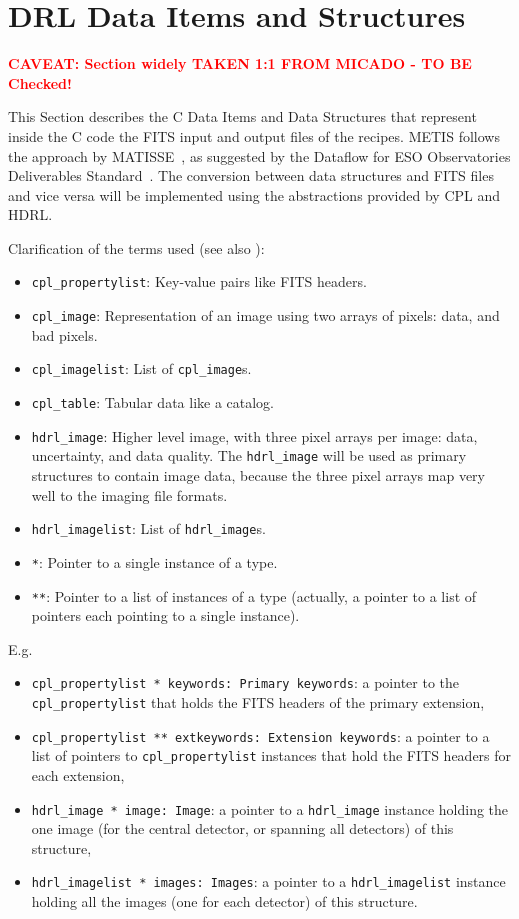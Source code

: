 \clearpage
\section{DRL Data Items and Structures}\label{sec:drl_data_structures}
\Large\textbf{\textcolor{red}{CAVEAT: Section widely TAKEN 1:1 FROM MICADO - TO BE Checked!}}\normalsize


This Section describes the C Data Items and Data Structures that represent inside the C code the FITS input and output files of the recipes. \ac{METIS} follows the approach by MATISSE~\cite{MATISSE-DRLD}, as suggested by the Dataflow for ESO Observatories Deliverables Standard~\cite{1618}.
The conversion between data structures and \ac{FITS} files and vice versa will be implemented using the abstractions provided by \ac{CPL} and \ac{HDRL}. 

Clarification of the terms used (see also \cite{hdrl-manual}):
\begin{itemize}
    \item \texttt{cpl\_propertylist}: Key-value pairs like \ac{FITS} headers.
    \item \texttt{cpl\_image}: Representation of an image using two arrays of pixels: data, and bad pixels.
    \item \texttt{cpl\_imagelist}: List of \texttt{cpl\_image}s.
    \item \texttt{cpl\_table}: Tabular data like a catalog.
    \item \texttt{hdrl\_image}: Higher level image, with three pixel arrays per image: data, uncertainty, and data quality.
          The \texttt{hdrl\_image} will be used as primary structures to contain image data, because the three pixel arrays map very well to the imaging file formats.
    \item \texttt{hdrl\_imagelist}: List of \texttt{hdrl\_image}s.
    \item \texttt{*}: Pointer to a single instance of a type.
    \item \texttt{**}: Pointer to a list of instances of a type (actually, a pointer to a list of pointers each pointing to a single instance).
\end{itemize}

E.g.
\begin{itemize}
    \item \texttt{cpl\_propertylist * keywords: Primary keywords}: a pointer to the \texttt{cpl\_propertylist} that holds the \ac{FITS} headers of the primary extension,
    \item \texttt{cpl\_propertylist ** extkeywords: Extension keywords}: a pointer to a list of pointers to \texttt{cpl\_propertylist} instances that hold the \ac{FITS} headers for each extension,
    \item \texttt{hdrl\_image * image: Image}: a pointer to a \texttt{hdrl\_image} instance holding the one image (for the central detector, or spanning all detectors) of this structure,
    \item \texttt{hdrl\_imagelist * images: Images}: a pointer to a \texttt{hdrl\_imagelist} instance holding all the images (one for each detector) of this structure.
\end{itemize}

